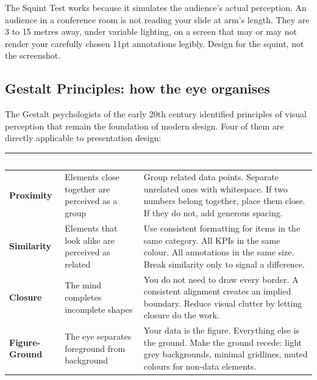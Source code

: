 The Squint Test works because it simulates the audience's actual perception. An audience in a conference room is not reading your slide at arm's length. They are 3 to 15 metres away, under variable lighting, on a screen that may or may not render your carefully chosen 11pt annotations legibly. Design for the squint, not the screenshot.


\subsection{Gestalt Principles: how the eye organises}


The Gestalt psychologists of the early 20th century identified principles of visual perception that remain the foundation of modern design. Four of them are directly applicable to presentation design:

\begin{center}
\small
{}
\begin{tabularx}{\textwidth}{>{\bfseries\color{heading}}p{2.8cm} p{4cm} X}
\toprule
\rowcolor{tableheader}
\textcolor{white}{\textbf{Principle}} & \textcolor{white}{\textbf{Definition}} & \textcolor{white}{\textbf{Presentation application}} \\
\midrule
Proximity & Elements close together are perceived as a group & Group related data points. Separate unrelated ones with whitespace. If two numbers belong together, place them close. If they do not, add generous spacing. \\
Similarity & Elements that look alike are perceived as related & Use consistent formatting for items in the same category. All KPIs in the same colour. All annotations in the same size. Break similarity only to signal a difference. \\
\rowcolor{altrow}
Closure & The mind completes incomplete shapes & You do not need to draw every border. A consistent alignment creates an implied boundary. Reduce visual clutter by letting closure do the work. \\
Figure-Ground & The eye separates foreground from background & Your data is the figure. Everything else is the ground. Make the ground recede: light grey backgrounds, minimal gridlines, muted colours for non-data elements. \\
\bottomrule
\end{tabularx}
\end{center}

